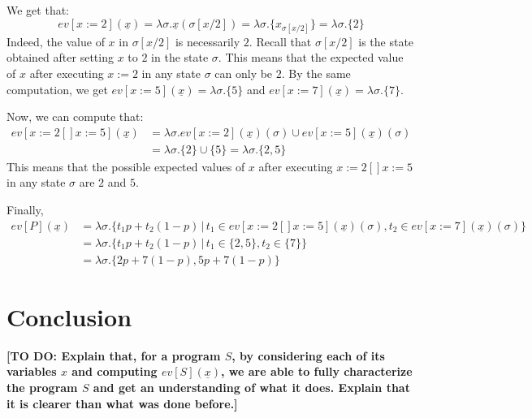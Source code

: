\documentclass[a4paper,10pt]{llncs}
\newcommand\todo[1]{{\color{red}\textbf{[TO DO:  #1]}}}
\begin{document}
We get that:
$$ev[x := 2](\underline{x}) = \lambda\sigma.\underline{x}(\sigma[x/2]) = \lambda\sigma.\{x_{\sigma[x/2]}\} = \lambda\sigma.\{2\}$$ 
Indeed, the value of $x$ in $\sigma[x/2]$ is necessarily $2$. Recall that $\sigma[x/2]$ is the state obtained after setting $x$ to $2$ in the state $\sigma$. This means that the expected value of $x$ after executing $x := 2$ in any state $\sigma$ can only be $2$. By the same computation, we get $ev[x := 5](\underline{x}) = \lambda\sigma.\{5\}$ and $ev[x := 7](\underline{x}) = \lambda\sigma.\{7\}$.\newline

Now, we can compute that:
\begin{align*}
ev[x := 2 [\!] x := 5](\underline{x}) &= \lambda\sigma. ev[x := 2](\underline{x})(\sigma) \cup ev[x := 5](\underline{x})(\sigma) \\
&= \lambda\sigma. \{2\} \cup \{5\} = \lambda\sigma.\{2,5\} 
\end{align*}
This means that the possible expected values of $x$ after executing $x := 2 [\!] x := 5$ in any state $\sigma$ are $2$ and $5$.\newline

Finally, 
\begin{align*}
ev[P](\underline{x}) &= \lambda\sigma.\{t_1 p+t_2(1-p) \,|\, t_1 \in ev[x := 2 [\!] x := 5](\underline{x})(\sigma), t_2 \in ev[x := 7](\underline{x})(\sigma) \} \\
&= \lambda\sigma.\{t_1 p+t_2(1-p) \,|\, t_1 \in \{2,5\}, t_2 \in \{7\} \} \\
&= \lambda\sigma. \{2p+7(1-p),5p+7(1-p) \} 
\end{align*}



\section{Conclusion}
\todo{Explain that, for a program $S$, by considering each of its variables $x$ and computing $ev[S](\underline{x})$, we are able to fully characterize the program $S$ and get an understanding of what it does. Explain that it is clearer than what was done before.}
\label{sec:conclusion}


{}

\end{document}
